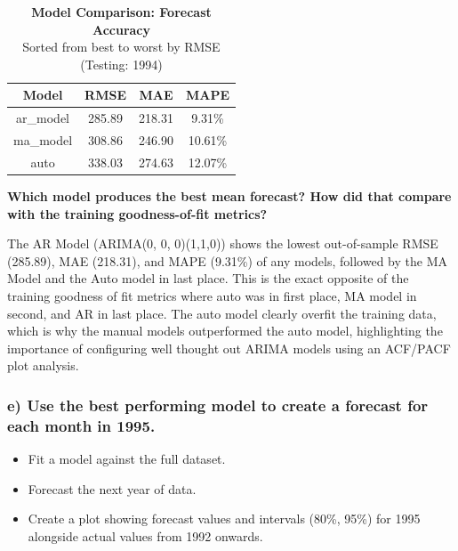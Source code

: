\documentclass[
  letterpaper,
  DIV=11,
  numbers=noendperiod]{scrartcl}
\providecommand{\tightlist}{%
  \setlength{\itemsep}{0pt}\setlength{\parskip}{0pt}}
\begin{document}
\begin{table}
\caption*{
{\fontsize{20}{25}\selectfont  \textbf{Model Comparison: Forecast Accuracy}\fontsize{12}{15}\selectfont } \\ 
{\fontsize{14}{17}\selectfont  Sorted from best to worst by RMSE (Testing: 1994)\fontsize{12}{15}\selectfont }
} 
\fontsize{12.0pt}{14.0pt}\selectfont
\begin{tabular*}{0.7\linewidth}{@{\extracolsep{\fill}}cccc}
\toprule
Model & RMSE & MAE & MAPE \\ 
\midrule\addlinespace[2.5pt]
ar\_model & 285.89 & 218.31 & 9.31\% \\ 
ma\_model & 308.86 & 246.90 & 10.61\% \\ 
auto & 338.03 & 274.63 & 12.07\% \\ 
\bottomrule
\end{tabular*}
\end{table}

\textbf{Which model produces the best mean forecast? How did that
compare with the training goodness-of-fit metrics?}

The AR Model (ARIMA(0, 0, 0)(1,1,0)) shows the lowest out-of-sample RMSE
(285.89), MAE (218.31), and MAPE (9.31\%) of any models, followed by the
MA Model and the Auto model in last place. This is the exact opposite of
the training goodness of fit metrics where auto was in first place, MA
model in second, and AR in last place. The auto model clearly overfit
the training data, which is why the manual models outperformed the auto
model, highlighting the importance of configuring well thought out ARIMA
models using an ACF/PACF plot analysis.

\newpage

\subsubsection{e) Use the best performing model to create a forecast for
each month in
1995.}\label{e-use-the-best-performing-model-to-create-a-forecast-for-each-month-in-1995.}

\begin{itemize}
\tightlist
\item
  Fit a model against the full dataset.
\item
  Forecast the next year of data.
\item
  Create a plot showing forecast values and intervals (80\%, 95\%) for
  1995 alongside actual values from 1992 onwards.
\end{itemize}
\end{document}
